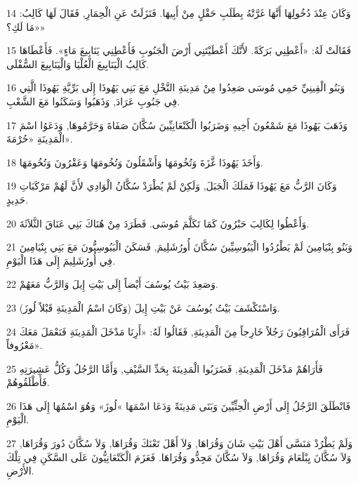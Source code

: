 \par 14 وَكَانَ عِنْدَ دُخُولِهَا أَنَّهَا غَرَّتْهُ بِطَلَبِ حَقْلٍ مِنْ أَبِيهَا. فَنَزَلَتْ عَنِ الْحِمَارِ, فَقَالَ لَهَا كَالِبُ: «مَا لَكِ؟»
\par 15 فَقَالَتْ لَهُ: «أَعْطِنِي بَرَكَةً. لأَنَّكَ أَعْطَيْتَنِي أَرْضَ الْجَنُوبِ فَأَعْطِنِي يَنَابِيعَ مَاءٍ». فَأَعْطَاهَا كَالِبُ الْيَنَابِيعَ الْعُلْيَا وَالْيَنَابِيعَ السُّفْلَى.
\par 16 وَبَنُو الْقِينِيِّ حَمِي مُوسَى صَعِدُوا مِنْ مَدِينَةِ النَّخْلِ مَعَ بَنِي يَهُوذَا إِلَى بَرِّيَّةِ يَهُوذَا الَّتِي فِي جَنُوبِ عَرَادَ, وَذَهَبُوا وَسَكَنُوا مَعَ الشَّعْبِ.
\par 17 وَذَهَبَ يَهُوذَا مَعَ شَمْعُونَ أَخِيهِ وَضَرَبُوا الْكَنْعَانِيِّينَ سُكَّانَ صَفَاةَ وَحَرَّمُوهَا, وَدَعَوُا اسْمَ الْمَدِينَةِ «حُرْمَةَ».
\par 18 وَأَخَذَ يَهُوذَا غَّزَةَ وَتُخُومَهَا وَأَشْقَلُونَ وَتُخُومَهَا وَعَقْرُونَ وَتُخُومَهَا.
\par 19 وَكَانَ الرَّبُّ مَعَ يَهُوذَا فَمَلَكَ الْجَبَلَ, وَلَكِنْ لَمْ يُطْرَدْ سُكَّانُ الْوَادِي لأَنَّ لَهُمْ مَرْكَبَاتِ حَدِيدٍ.
\par 20 وَأَعْطُوا لِكَالِبَ حَبْرُونَ كَمَا تَكَلَّمَ مُوسَى. فَطَرَدَ مِنْ هُنَاكَ بَنِي عَنَاقَ الثَّلاَثَةَ.
\par 21 وَبَنُو بِنْيَامِينَ لَمْ يَطْرُدُوا الْيَبُوسِيِّينَ سُكَّانَ أُورُشَلِيمَ, فَسَكَنَ الْيَبُوسِيُّونَ مَعَ بَنِي بِنْيَامِينَ فِي أُورُشَلِيمَ إِلَى هَذَا الْيَوْمِ.
\par 22 وَصَعِدَ بَيْتُ يُوسُفَ أَيْضاً إِلَى بَيْتِ إِيلَ وَالرَّبُّ مَعَهُمْ.
\par 23 وَاسْتَكْشَفَ بَيْتُ يُوسُفَ عَنْ بَيْتِ إِيلَ (وَكَانَ اسْمُ الْمَدِينَةِ قَبْلاً لُوزَ).
\par 24 فَرَأَى الْمُرَاقِبُونَ رَجُلاً خَارِجاً مِنَ الْمَدِينَةِ, فَقَالُوا لَهُ: «أَرِنَا مَدْخَلَ الْمَدِينَةِ فَنَعْمَلَ مَعَكَ مَعْرُوفاً».
\par 25 فَأَرَاهُمْ مَدْخَلَ الْمَدِينَةِ, فَضَرَبُوا الْمَدِينَةَ بِحَدِّ السَّيْفِ, وَأَمَّا الرَّجُلُ وَكُلُّ عَشِيرَتِهِ فَأَطْلَقُوهُمْ.
\par 26 فَانْطَلَقَ الرَّجُلُ إِلَى أَرْضِ الْحِثِّيِّينَ وَبَنَى مَدِينَةً وَدَعَا اسْمَهَا »لُوزَ» وَهُوَ اسْمُهَا إِلَى هَذَا الْيَوْمِ.
\par 27 وَلَمْ يَطْرُدْ مَنَسَّى أَهْلَ بَيْتِ شَانَ وَقُرَاهَا, وَلاَ أَهْلَ تَعْنَكَ وَقُرَاهَا, وَلاَ سُكَّانَ دُورَ وَقُرَاهَا, وَلاَ سُكَّانَ يِبْلَعَامَ وَقُرَاهَا, وَلاَ سُكَّانَ مَجِدُّو وَقُرَاهَا. فَعَزَمَ الْكَنْعَانِيُّونَ عَلَى السَّكَنِ فِي تِلْكَ الأَرْضِ.
